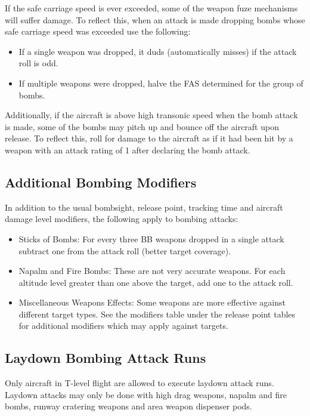 If the safe carriage speed is ever exceeded, some of the weapon fuze mechanisms will suffer damage. To reflect this, when an attack is made dropping bombs whose safe carriage speed was exceeded use the following:

\begin{itemize}
    \item If a single weapon was dropped, it duds (automatically misses) if the attack roll is odd.
    \item If multiple weapons were dropped, halve the FAS determined for the group of bombs.
\end{itemize}

Additionally, if the aircraft is above high transonic speed when the bomb attack is made, some of the bombs may pitch up and bounce off the aircraft upon release. To reflect this, roll for damage to the aircraft as if it had been hit by a weapon with an attack rating of 1 after declaring the bomb attack.

\subsection{Additional Bombing Modifiers} In addition to the usual bombsight, release point, tracking time and aircraft damage level modifiers, the following apply to bombing attacks:

\begin{itemize}
    \item Sticks of Bombs: For every three BB weapons dropped in a single attack subtract one from the attack roll (better target coverage).

    \item Napalm and Fire Bombs: These are not very accurate weapons. For each altitude level greater than one above the target, add one to the attack roll.

    \item Miscellaneous Weapons Effects: Some weapons are more effective against different target types. See the modifiers table under the release point tables for additional modifiers which may apply against targets.
\end{itemize}

\subsection{Laydown Bombing Attack Runs} Only aircraft in T-level flight are allowed to execute laydown attack runs. Laydown attacks may only be done with high drag weapons, napalm and fire bombs, runway cratering weapons and area weapon dispenser pods.

